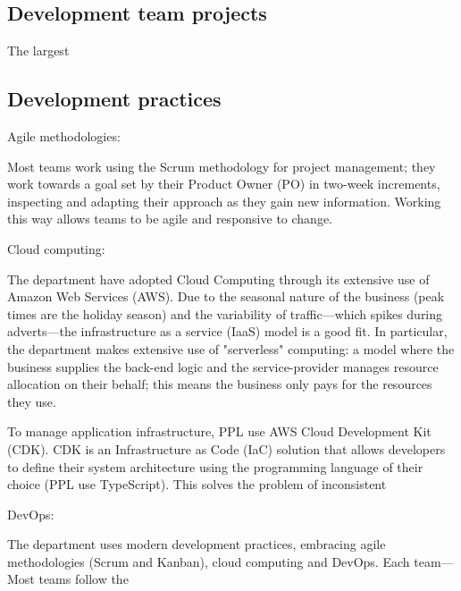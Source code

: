 \subsection{Development team projects}

The largest 

\subsection{Development practices}

Agile methodologies:

Most teams work using the Scrum methodology for project management; they work
towards a goal set by their Product Owner (PO) in two-week increments,
inspecting and adapting their approach as they gain new information. Working
this way allows teams to be agile and responsive to change.

Cloud computing:

The department have adopted Cloud Computing through its extensive use of 
Amazon Web Services (AWS). Due to the seasonal nature of the business
(peak times are the holiday season) and the variability of traffic---which
spikes during adverts---the infrastructure as a service (IaaS) model is a good
fit. In particular, the department makes extensive use of "serverless"
computing: a model where the business supplies the back-end logic and the
service-provider manages resource allocation on their behalf; this means the
business only pays for the resources they use.

To manage application infrastructure, PPL use AWS Cloud Development Kit (CDK). CDK
is an Infrastructure as Code (IaC) solution that allows developers to define
their system architecture using the programming language of their choice (PPL
use TypeScript). This solves the problem of inconsistent 

DevOps:

The department uses modern development practices, embracing agile methodologies
(Scrum and Kanban), cloud computing and DevOps. Each team--- Most teams follow the
